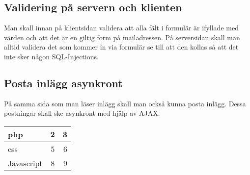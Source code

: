 \documentclass[12pt]{article}
\begin{document}
\subsection {Validering på servern och klienten}
Man skall innan på klientsidan validera att alla fält i formulär är ifyllade med värden och att det är en giltig form på mailadressen. På serversidan skall man alltid validera det som kommer in via formulär se till att den kollas så att det inte sker någon SQL-Injections. 
\subsection {Posta inlägg asynkront}
På samma sida som man läser inlägg skall man också kunna posta inlägg. Dessa postningar skall ske asynkront med hjälp av AJAX. 

\begin{tabular}{ l | c | r }
  php & 2 & 3 \\ \hline
  css & 5 & 6 \\ \hline
  Javascript & 8 & 9 \\
\end{tabular}
\end{document}
